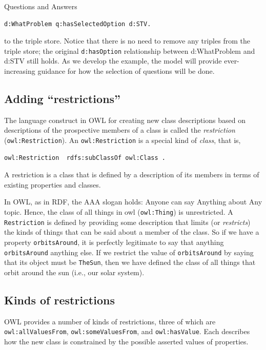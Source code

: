 \begin{example}{Questions and Answers}
\begin{lstlisting}
d:WhatProblem q:hasSelectedOption d:STV.
\end{lstlisting}

to the triple store. Notice that there is no need to remove any triples
from the triple store; the original \texttt{d:hasOption} relationship between
d:WhatProblem and d:STV still holds. As we develop the example, the
model will provide ever-increasing guidance for how the selection of
questions will be done.

\end{example}

\subsection{Adding ``restrictions''}

The language construct in OWL for creating new class descriptions based
on descriptions of the prospective members of a class is called the
\emph{restriction} (\texttt{owl:Restriction}). An \texttt{owl:Restriction} is a special kind of
\emph{class}, that is, 

\begin{lstlisting}
owl:Restriction  rdfs:subClassOf owl:Class .
\end{lstlisting}

A restriction is a class that is defined by a description of its members
in terms of existing properties and classes.

In OWL, as in RDF, the AAA slogan holds: Anyone can say Anything about
Any topic. Hence, the class of all things in owl (\texttt{owl:Thing}) is
unrestricted. A \texttt{Restriction} is defined by providing some description
that limits (or \emph{restricts}) the kinds of things that can be said about a
member of the class. So if we have a property \texttt{orbitsAround}, it is
perfectly legitimate to say that anything \texttt{orbitsAround} anything else. If
we restrict the value of \texttt{orbitsAround} by saying that its object must be
\texttt{TheSun}, then we have defined the class of all things that orbit around
the sun (i.e., our solar system).

\subsection{Kinds of restrictions}
\label{ch12.restriction}
OWL provides a number of kinds of restrictions, three of which are
\texttt{owl:allValuesFrom}, \texttt{owl:someValuesFrom}, and \texttt{owl:hasValue}. Each describes
how the new class is constrained by the possible asserted values of
properties.

